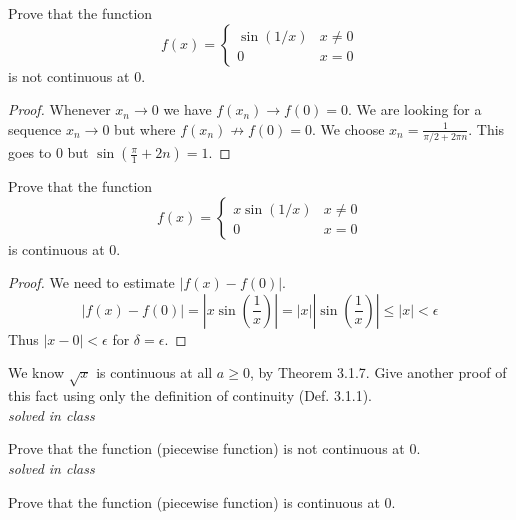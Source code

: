 \documentclass[12pt]{book}
\newenvironment{exercise}[2][Exercise]{\begin{trivlist}
\item[\hskip \labelsep {\bfseries #1}\hskip \labelsep {\bfseries #2.}]}{\end{trivlist}}
\begin{document}
\begin{exercise}{1.4.6}
\begin{exercise}{3.1.11}
    Prove that the function
        \[ f(x)= \begin{cases} \sin (1/x) & x\neq 0 \\ 0 & x =0 \end{cases} \]
    is not continuous at 0.
    
    \begin{proof}
    Whenever $x_n \to 0$ we have $f(x_n) \to f(0) = 0$. We are looking for a sequence $x_n \to 0$ but where $f(x_n) \not\to f(0)=0$. We choose $x_n = \frac{1}{\pi/2 + 2 \pi n}$. This goes to 0 but $\sin(\frac{\pi}{1} +2n)=1$.
    \end{proof}
\end{exercise}



\begin{exercise}{3.1.12}
    Prove that the function
        \[ f(x)= \begin{cases} x \sin(1/x) & x \neq 0 \\ 0 & x=0 \end{cases} \]
    is continuous at 0.
    
    \begin{proof}
    We need to estimate $|f(x)-f(0)|$.
    \[ |f(x)-f(0)| = |x \sin \left(\frac{1}{x} \right)| = |x| |\sin \left( \frac{1}{x} \right)| \leq |x| < \epsilon \]
    Thus $|x-0|<\epsilon$ for $\delta = \epsilon$.
    \end{proof}
\end{exercise}







\begin{exercise}{3.1.8}
We know $\sqrt{x}$ is continuous at all $a \geq 0$, by Theorem 3.1.7. Give another proof of this fact using only the definition of continuity (Def. 3.1.1). \\

\emph{solved in class}
\end{exercise}


\begin{exercise}{3.1.11}
Prove that the function (piecewise function) is not continuous at 0.\\

\emph{solved in class}
\end{exercise}

\begin{exercise}{3.1.12}
Prove that the function (piecewise function) is continuous at 0.\\


\end{exercise}
\end{exercise}
\end{document}
